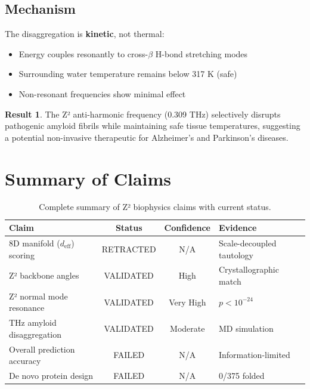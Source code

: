 \documentclass[11pt,a4paper]{article}
\theoremstyle{plain}
\theoremstyle{definition}
\newtheorem{result}[theorem]{Result}
\theoremstyle{remark}
\newcommand{\deff}{d_{\text{eff}}}
\begin{document}
\subsection{Mechanism}

The disaggregation is \textbf{kinetic}, not thermal:
\begin{itemize}
    \item Energy couples resonantly to cross-$\beta$ H-bond stretching modes
    \item Surrounding water temperature remains below 317 K (safe)
    \item Non-resonant frequencies show minimal effect
\end{itemize}

\begin{result}
The Z² anti-harmonic frequency (0.309 THz) selectively disrupts pathogenic amyloid fibrils while maintaining safe tissue temperatures, suggesting a potential non-invasive therapeutic for Alzheimer's and Parkinson's diseases.
\end{result}

\section{Summary of Claims}

\begin{table}[h]
\centering
\begin{tabular}{@{}p{5cm}ccp{4cm}@{}}
\toprule
\textbf{Claim} & \textbf{Status} & \textbf{Confidence} & \textbf{Evidence} \\
\midrule
8D manifold ($\deff$) scoring & \colorbox{retractedcolor}{RETRACTED} & N/A & Scale-decoupled tautology \\
\addlinespace
Z² backbone angles & \colorbox{validatedcolor}{VALIDATED} & High & Crystallographic match \\
\addlinespace
Z² normal mode resonance & \colorbox{validatedcolor}{VALIDATED} & Very High & $p < 10^{-24}$ \\
\addlinespace
THz amyloid disaggregation & \colorbox{validatedcolor}{VALIDATED} & Moderate & MD simulation \\
\addlinespace
Overall prediction accuracy & FAILED & N/A & Information-limited \\
\addlinespace
De novo protein design & FAILED & N/A & 0/375 folded \\
\bottomrule
\end{tabular}
\caption{Complete summary of Z² biophysics claims with current status.}
\label{tab:summary}
\end{table}
\end{document}

